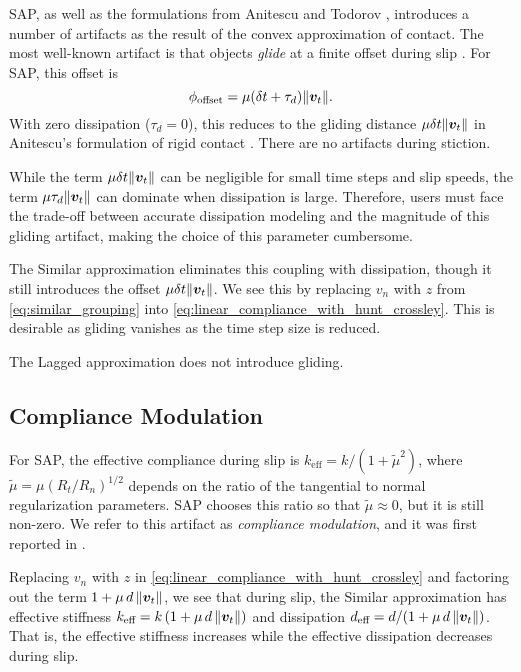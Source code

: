 SAP, as well as the formulations from Anitescu and Todorov
\cite{bib:anitescu2006,bib:todorov2011}, introduces a number of artifacts as the result
of the convex approximation of contact. The most well-known artifact is that
objects \emph{glide} at a finite offset during slip \cite{bib:mazhar2014,
bib:horak2019, bib:castro2022unconstrained}. For SAP,
this offset is \cite{bib:castro2022unconstrained}
\begin{equation}
    \phi_\text{offset} = \mu(\delta t + \tau_d)\Vert\vf{v}_t\Vert.
    \label{eq:sap_gliding_offset}
\end{equation}
With zero dissipation ($\tau_d=0$), this reduces to the gliding distance $\mu\delta
t\Vert{\bm{v}}_t\Vert$ in Anitescu's formulation of rigid contact
\cite{bib:anitescu2006}. There are no artifacts during stiction.

While the term $\mu\delta t\Vert{\bm{v}}_t\Vert$ can be negligible for small time
steps and slip speeds, the term $\mu\tau_d\Vert{\bm{v}}_t\Vert$ can dominate when
dissipation is large. Therefore, users must face the trade-off between accurate
dissipation modeling and the magnitude of this gliding artifact, making the
choice of this parameter cumbersome.

The Similar approximation eliminates this coupling with dissipation,
though it still introduces the offset $\mu\delta t\Vert{\bm{v}}_t\Vert$. We see
this by replacing $v_n$ with $z$ from \eqref{eq:similar_grouping} into
\eqref{eq:linear_compliance_with_hunt_crossley}. This is desirable as gliding
vanishes as the time step size is reduced.

The Lagged approximation does not introduce gliding.

\subsection{Compliance Modulation}
\label{sec:compliance_modulation}

For SAP, the effective compliance during slip is $k_\text{eff} =
k/(1+\tilde{\mu}^2)$, where $\tilde{\mu}=\mu(R_t/R_n)^{1/2}$
\cite{bib:castro2022unconstrained} depends on the ratio of the tangential to
normal regularization parameters. SAP chooses this ratio so that
$\tilde{\mu}\approx0$, but it is still non-zero. We refer to this artifact as
\emph{compliance modulation}, and it was first reported in
\cite{bib:castro2022unconstrained}.

Replacing $v_n$ with $z$ in \eqref{eq:linear_compliance_with_hunt_crossley} and
factoring out the term $1+\mu\,d\,\Vert{\bm{v}}_t\Vert$, we see that during slip,
the Similar approximation has effective stiffness $k_\text{eff} =
k\,(1+\mu\,d\,\Vert{\bm{v}}_t\Vert)$ and dissipation $d_\text{eff} =
d/(1+\mu\,d\,\Vert{\bm{v}}_t\Vert)$. That is, the effective stiffness increases
while the effective dissipation decreases during slip.

